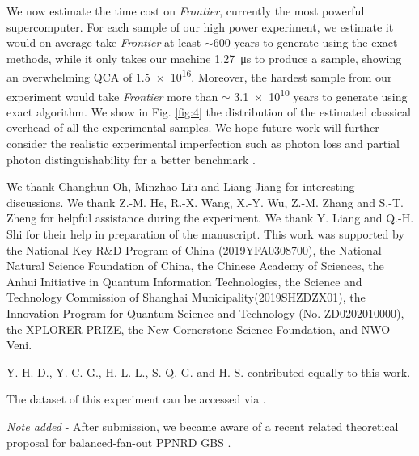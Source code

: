 \documentclass[aps,prl,groupedaddress,superscriptaddress,showpacs,reprint,nofootinbib,nolongbibliography]{revtex4-2}
\begin{document}
We now estimate the time cost on \textit{Frontier}, currently the most powerful supercomputer. For each sample of our high power experiment, we estimate it would on average take \textit{Frontier} at least $\sim 600$ years to generate using the exact methods, while it only takes our machine \SI{1.27}{\us} to produce a sample, showing an overwhelming QCA of \num{1.5e16}. Moreover, the hardest sample from our experiment would take \textit{Frontier} more than $\sim$ \num{3.1e10} years to generate using exact algorithm. We show in Fig. \ref{fig:4} the distribution of the estimated classical overhead of all the experimental samples. We hope future work will further consider the realistic experimental imperfection such as photon loss and partial photon distinguishability for a better benchmark \cite{oh2023newsim}.


\begin{acknowledgments}

We thank Changhun Oh, Minzhao Liu and Liang Jiang for interesting discussions. We thank Z.-M. He, R.-X. Wang, X.-Y. Wu, Z.-M. Zhang and S.-T. Zheng for helpful assistance during the experiment. We thank Y. Liang and Q.-H. Shi for their help in preparation of the manuscript. This work was supported by the National Key R\&D Program of China (2019YFA0308700), the National Natural Science Foundation of China, the Chinese Academy of Sciences, the Anhui Initiative in Quantum Information Technologies, the Science and Technology Commission of Shanghai Municipality(2019SHZDZX01), the Innovation Program for Quantum Science and Technology (No. ZD0202010000), the XPLORER PRIZE, the New Cornerstone Science Foundation, and NWO Veni.

Y.-H. D., Y.-C. G., H.-L. L., S.-Q. G. and H. S. contributed equally to
this work.

The dataset of this experiment can be accessed via \cite{JZ3data}.

\textit{Note added} - After submission, we became aware of a recent related theoretical proposal for balanced-fan-out PPNRD GBS \cite{bressanini2023PPNRDgaussian}.

\end{acknowledgments}

% 

\end{document}
